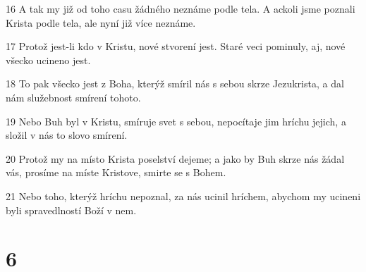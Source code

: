 \par 16 A tak my již od toho casu žádného neznáme podle tela. A ackoli jsme poznali Krista podle tela, ale nyní již více neznáme.
\par 17 Protož jest-li kdo v Kristu, nové stvorení jest. Staré veci pominuly, aj, nové všecko ucineno jest.
\par 18 To pak všecko jest z Boha, kterýž smíril nás s sebou skrze Jezukrista, a dal nám služebnost smírení tohoto.
\par 19 Nebo Buh byl v Kristu, smíruje svet s sebou, nepocítaje jim hríchu jejich, a složil v nás to slovo smírení.
\par 20 Protož my na místo Krista poselství dejeme; a jako by Buh skrze nás žádal vás, prosíme na míste Kristove, smirte se s Bohem.
\par 21 Nebo toho, kterýž hríchu nepoznal, za nás ucinil hríchem, abychom my ucineni byli spravedlností Boží v nem.

\chapter{6}

